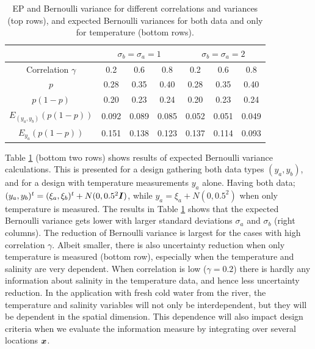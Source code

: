 \documentclass[aoas]{imsart}
\begin{document}
\begin{table}[!h] \centering \caption{EP and Bernoulli variance for different correlations and variances (top rows), and expected Bernoulli variances for both data 
    and only for temperature (bottom rows).}
  \begin{tabular}{c|ccc|ccc}
 &\multicolumn{3}{c}{$\sigma_b=\sigma_a=1$} & \multicolumn{3}{c}{$\sigma_b=\sigma_a=2$} \\
\hline
Correlation $\gamma$ & 0.2 & 0.6 & 0.8 & 0.2 & 0.6 & 0.8 \\
\hline
$p$ & 0.28 & 0.35 & 0.40 & 0.28 & 0.35 & 0.40 \\ 
$p(1-p)$ & 0.20 & 0.23 & 0.24 & 0.20 & 0.23 & 0.24 \\ 
$E_{(y_a,y_b)}(p (1-p))$ & 0.092 & 0.089 & 0.085 & 0.052 & 0.051 & 0.049 \\ 
$E_{y_a}(p (1-p))$ & 0.151 & 0.138 & 0.123 & 0.137 & 0.114 & 0.093 \\ 
\hline
\end{tabular}
\label{tab:sim_rhoab}
\end{table}

Table \ref{tab:sim_rhoab} (bottom two rows) shows results of expected Bernoulli variance calculations. This is presented for a design gathering both data types $(y_a,y_b)$, and for a design with temperature measurements $y_a$ alone. Having both data; $(y_a,y_b)^t=(\xi_a,\xi_b)^t+N(0,0.5^2{\boldsymbol I})$, while $y_a=\xi_a+N(0,0.5^2)$ when only temperature is measured.
The results in Table \ref{tab:sim_rhoab} shows that 
the expected Bernoulli variance gets lower with larger standard deviations $\sigma_a$ and $\sigma_b$ (right columns). The reduction of Bernoulli variance is largest for the cases with high correlation $\gamma$. Albeit smaller, there is also uncertainty reduction when only temperature is measured (bottom row), especially when the temperature and salinity are very dependent. When correlation is low ($\gamma=0.2$) there is hardly any information about salinity in the temperature data, and hence less uncertainty reduction. In the application with fresh cold water from the river, the temperature and salinity variables will not only be interdependent, but they will be dependent in the spatial dimension. This dependence will also impact design criteria when we evaluate the information measure by integrating over several locations ${\boldsymbol x}$. 

\end{document}
